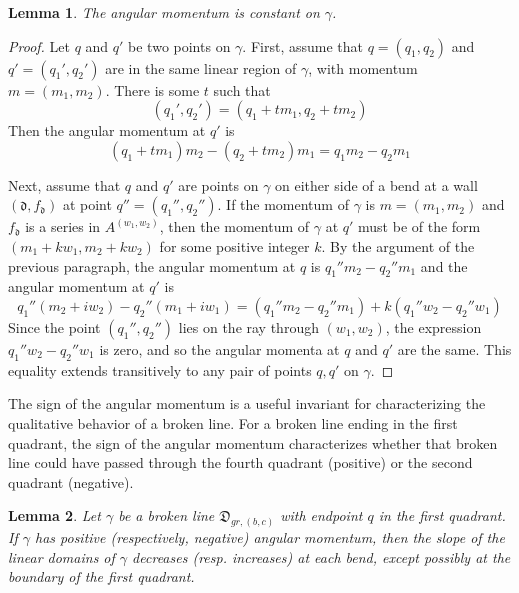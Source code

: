 \documentclass[11pt]{amsart}
\newtheorem{lemma}{Lemma}[section]
\theoremstyle{remark}
\numberwithin{equation}{section}
\newcommand{\fd}{\mathfrak{d}}
\begin{document}
\begin{lemma}
The angular momentum is constant on $\gamma$.
\end{lemma}
\begin{proof}
Let $q$ and $q'$ be two points on $\gamma$.
First, assume that $q=(q_1,q_2)$ and $q'=(q_1',q_2')$ are in the same linear region of $\gamma$, with momentum $m=(m_1,m_2)$.  There is some $t$ such that 
\[ (q_1',q_2') = (q_1+tm_1,q_2+tm_2) \]
Then the angular momentum at $q'$ is 
\[ (q_1+tm_1)m_2-(q_2+tm_2)m_1 = q_1m_2 - q_2m_1 \]

Next, assume that $q$ and $q'$ are points on $\gamma$ on either side of a bend at a wall $(\fd, f_{\fd})$ at point $q''=(q_1'',q_2'')$.  If the momentum of $\gamma$ is $m=(m_1,m_2)$ and $f_{\fd}$ is a series in $A^{(w_1,w_2)}$, then the momentum of $\gamma$ at $q'$ must be of the form $(m_1+kw_1,m_2+kw_2)$ for some positive integer $k$.  By the argument of the previous paragraph, the angular momentum at $q$ is $q_1''m_2-q_2''m_1$
and the angular momentum at $q'$ is
\[ q_1''(m_2+iw_2)-q_2''(m_1+iw_1) = (q_1''m_2-q_2''m_1)+k(q_1''w_2-q_2''w_1) \]
Since the point $(q_1'',q_2'')$ lies on the ray through $(w_1,w_2)$, the expression $q_1''w_2-q_2''w_1$ is zero, and so the angular momenta at $q$ and $q'$ are the same.  This equality extends transitively to any pair of points $q,q'$ on $\gamma$.
\end{proof}
The sign of the angular momentum is a useful invariant for characterizing the qualitative behavior of a broken line.
For a broken line ending in the first quadrant, the sign of the angular momentum characterizes whether that broken line could have passed through the fourth quadrant (positive) or the second quadrant (negative).

\begin{lemma}
Let $\gamma$ be a broken line $\mathfrak{D}_{gr,(b,c)}$ with endpoint $q$ in the first quadrant. If $\gamma$ has positive (respectively, negative) angular momentum, then the slope of the linear domains of $\gamma$ decreases (resp. increases) at each bend, except possibly at the boundary of the first quadrant. 
\end{lemma}
\end{document}
